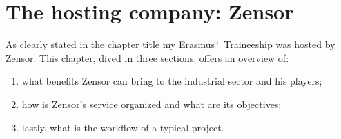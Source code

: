 \chapter{The hosting company: Zensor}

As clearly stated in the chapter title my Erasmus$^{+}$ Traineeship was hosted by Zensor. 
This chapter, dived in three sections, offers an overview of:
\begin{enumerate}
    \item what benefits Zensor can bring to the industrial sector and his players;
    \item how is Zensor's service organized and what are its objectives;
    \item lastly, what is the workflow of a typical project.
\end{enumerate}




